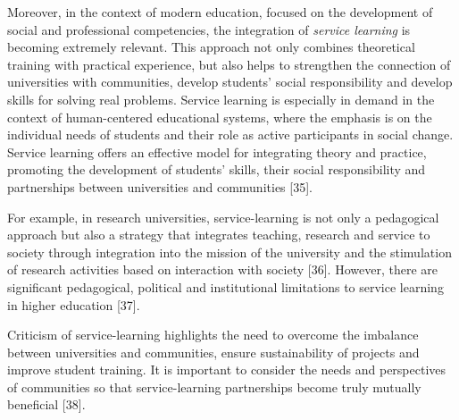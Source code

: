 \begin{multicols}{2}
Moreover, in the context of modern education, focused on the development
of social and professional competencies, the integration of
\emph{service learning} is becoming extremely relevant. This approach
not only combines theoretical training with practical experience, but
also helps to strengthen the connection of universities with
communities, develop students'{} social responsibility
and develop skills for solving real problems. Service learning is
especially in demand in the context of human-centered educational
systems, where the emphasis is on the individual needs of students and
their role as active participants in social change. Service learning
offers an effective model for integrating theory and practice, promoting
the development of students'{} skills, their social
responsibility and partnerships between universities and communities
{[}35{]}.

For example, in research universities, service-learning is not only a
pedagogical approach but also a strategy that integrates teaching,
research and service to society through integration into the mission of
the university and the stimulation of research activities based on
interaction with society {[}36{]}. However, there are significant
pedagogical, political and institutional limitations to service learning
in higher education {[}37{]}.

Criticism of service-learning highlights the need to overcome the
imbalance between universities and communities, ensure sustainability of
projects and improve student training. It is important to consider the
needs and perspectives of communities so that service-learning
partnerships become truly mutually beneficial {[}38{]}.


\end{multicols}
